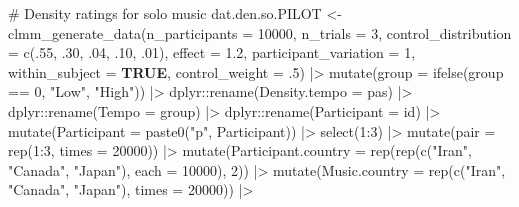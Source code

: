 \documentclass[
  bookmarksnumbered]{article}
\newenvironment{Shaded}{\begin{snugshade}}{\end{snugshade}}
\newcommand{\AttributeTok}[1]{\textcolor[rgb]{0.80,0.80,0.80}{#1}}
\newcommand{\CommentTok}[1]{\textcolor[rgb]{0.50,0.62,0.50}{#1}}
\newcommand{\ConstantTok}[1]{\textcolor[rgb]{0.86,0.64,0.64}{\textbf{#1}}}
\newcommand{\DecValTok}[1]{\textcolor[rgb]{0.86,0.86,0.80}{#1}}
\newcommand{\FloatTok}[1]{\textcolor[rgb]{0.75,0.75,0.82}{#1}}
\newcommand{\FunctionTok}[1]{\textcolor[rgb]{0.94,0.94,0.56}{#1}}
\newcommand{\NormalTok}[1]{\textcolor[rgb]{0.80,0.80,0.80}{#1}}
\newcommand{\OtherTok}[1]{\textcolor[rgb]{0.94,0.94,0.56}{#1}}
\newcommand{\SpecialCharTok}[1]{\textcolor[rgb]{0.86,0.64,0.64}{#1}}
\newcommand{\StringTok}[1]{\textcolor[rgb]{0.80,0.58,0.58}{#1}}
\begin{document}
\begin{Shaded}
\begin{Highlighting}[]
\CommentTok{\# Density ratings for solo music}
\NormalTok{dat.den.so.PILOT }\OtherTok{\textless{}{-}} \FunctionTok{clmm\_generate\_data}\NormalTok{(}\AttributeTok{n\_participants =} \DecValTok{10000}\NormalTok{,}
                                 \AttributeTok{n\_trials =} \DecValTok{3}\NormalTok{,}
                                 \AttributeTok{control\_distribution =} \FunctionTok{c}\NormalTok{(.}\DecValTok{55}\NormalTok{, .}\DecValTok{30}\NormalTok{, .}\DecValTok{04}\NormalTok{, .}\DecValTok{10}\NormalTok{, .}\DecValTok{01}\NormalTok{),}
                                 \AttributeTok{effect =} \FloatTok{1.2}\NormalTok{,}
                                 \AttributeTok{participant\_variation =} \DecValTok{1}\NormalTok{,}
                                 \AttributeTok{within\_subject =} \ConstantTok{TRUE}\NormalTok{,}
                                 \AttributeTok{control\_weight =}\NormalTok{ .}\DecValTok{5}\NormalTok{) }\SpecialCharTok{|\textgreater{}}
  \FunctionTok{mutate}\NormalTok{(}\AttributeTok{group =} \FunctionTok{ifelse}\NormalTok{(group }\SpecialCharTok{==} \DecValTok{0}\NormalTok{, }\StringTok{"Low"}\NormalTok{, }\StringTok{"High"}\NormalTok{)) }\SpecialCharTok{|\textgreater{}}
\NormalTok{  dplyr}\SpecialCharTok{::}\FunctionTok{rename}\NormalTok{(}\AttributeTok{Density.tempo =}\NormalTok{ pas) }\SpecialCharTok{|\textgreater{}}
\NormalTok{  dplyr}\SpecialCharTok{::}\FunctionTok{rename}\NormalTok{(}\AttributeTok{Tempo =}\NormalTok{ group) }\SpecialCharTok{|\textgreater{}}
\NormalTok{  dplyr}\SpecialCharTok{::}\FunctionTok{rename}\NormalTok{(}\AttributeTok{Participant =}\NormalTok{ id) }\SpecialCharTok{|\textgreater{}}
  \FunctionTok{mutate}\NormalTok{(}\AttributeTok{Participant =} \FunctionTok{paste0}\NormalTok{(}\StringTok{"p"}\NormalTok{, Participant)) }\SpecialCharTok{|\textgreater{}}
  \FunctionTok{select}\NormalTok{(}\DecValTok{1}\SpecialCharTok{:}\DecValTok{3}\NormalTok{) }\SpecialCharTok{|\textgreater{}}
  \FunctionTok{mutate}\NormalTok{(}\AttributeTok{pair =} \FunctionTok{rep}\NormalTok{(}\DecValTok{1}\SpecialCharTok{:}\DecValTok{3}\NormalTok{, }\AttributeTok{times =} \DecValTok{20000}\NormalTok{)) }\SpecialCharTok{|\textgreater{}}
  \FunctionTok{mutate}\NormalTok{(}\AttributeTok{Participant.country =} \FunctionTok{rep}\NormalTok{(}\FunctionTok{rep}\NormalTok{(}\FunctionTok{c}\NormalTok{(}\StringTok{"Iran"}\NormalTok{, }\StringTok{"Canada"}\NormalTok{, }\StringTok{"Japan"}\NormalTok{), }\AttributeTok{each =} \DecValTok{10000}\NormalTok{), }\DecValTok{2}\NormalTok{)) }\SpecialCharTok{|\textgreater{}}
  \FunctionTok{mutate}\NormalTok{(}\AttributeTok{Music.country =} \FunctionTok{rep}\NormalTok{(}\FunctionTok{c}\NormalTok{(}\StringTok{"Iran"}\NormalTok{, }\StringTok{"Canada"}\NormalTok{, }\StringTok{"Japan"}\NormalTok{), }\AttributeTok{times =} \DecValTok{20000}\NormalTok{)) }\SpecialCharTok{|\textgreater{}}

\end{Highlighting}
\end{Shaded}
\end{document}

